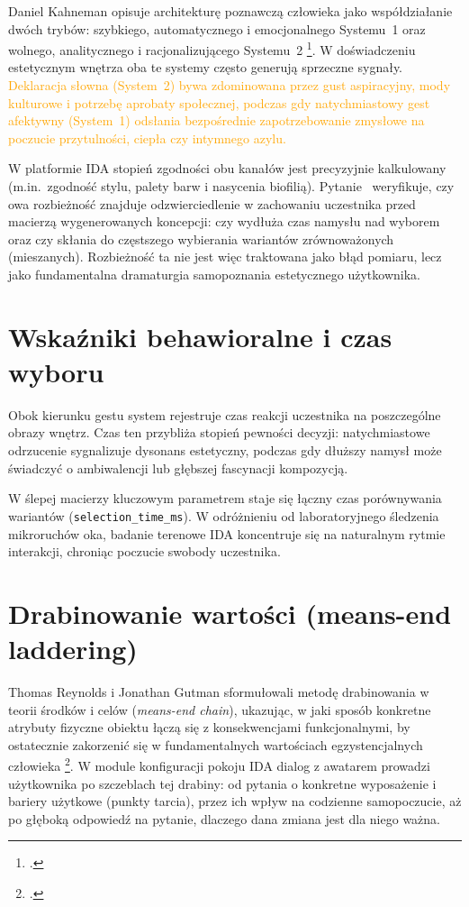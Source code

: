 Daniel Kahneman opisuje architekturę poznawczą człowieka jako współdziałanie dwóch trybów: szybkiego, automatycznego i emocjonalnego Systemu~1 oraz wolnego, analitycznego i racjonalizującego Systemu~2 \footcite{kahneman2011thinking}.
W doświadczeniu estetycznym wnętrza oba te systemy często generują sprzeczne sygnały. \textcolor{orange}{Deklaracja słowna (System~2) bywa zdominowana przez gust aspiracyjny, mody kulturowe i potrzebę aprobaty społecznej, podczas gdy natychmiastowy gest afektywny (System~1) odsłania bezpośrednie zapotrzebowanie zmysłowe na poczucie przytulności, ciepła czy intymnego azylu.}

W platformie IDA stopień zgodności obu kanałów jest precyzyjnie kalkulowany (m.in.\ zgodność stylu, palety barw i nasycenia biofilią).
Pytanie~ weryfikuje, czy owa rozbieżność znajduje odzwierciedlenie w zachowaniu uczestnika przed macierzą wygenerowanych koncepcji: czy wydłuża czas namysłu nad wyborem oraz czy skłania do częstszego wybierania wariantów zrównoważonych (mieszanych).
Rozbieżność ta nie jest więc traktowana jako błąd pomiaru, lecz jako fundamentalna dramaturgia samopoznania estetycznego użytkownika.

\section{Wskaźniki behawioralne i czas wyboru}
\label{ch03:sec:behavioral}

Obok kierunku gestu system rejestruje czas reakcji uczestnika na poszczególne obrazy wnętrz. Czas ten przybliża stopień pewności decyzji: natychmiastowe odrzucenie sygnalizuje dysonans estetyczny, podczas gdy dłuższy namysł może świadczyć o ambiwalencji lub głębszej fascynacji kompozycją.

W ślepej macierzy kluczowym parametrem staje się łączny czas porównywania wariantów (\texttt{selection\_time\_ms}). W odróżnieniu od laboratoryjnego śledzenia mikroruchów oka, badanie terenowe IDA koncentruje się na naturalnym rytmie interakcji, chroniąc poczucie swobody uczestnika.

\section{Drabinowanie wartości (means-end laddering)}
\label{ch03:sec:laddering}

Thomas Reynolds i Jonathan Gutman sformułowali metodę drabinowania w teorii środków i celów (\emph{means-end chain}), ukazując, w jaki sposób konkretne atrybuty fizyczne obiektu łączą się z konsekwencjami funkcjonalnymi, by ostatecznie zakorzenić się w fundamentalnych wartościach egzystencjalnych człowieka \footcite{reynolds1988laddering}.
W module konfiguracji pokoju IDA dialog z awatarem prowadzi użytkownika po szczeblach tej drabiny: od pytania o konkretne wyposażenie i bariery użytkowe (punkty tarcia), przez ich wpływ na codzienne samopoczucie, aż po głęboką odpowiedź na pytanie, dlaczego dana zmiana jest dla niego ważna.

